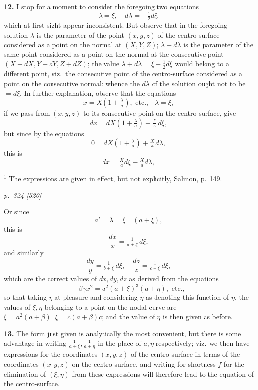 \documentclass[11pt,a4paper]{book}
\begin{document}
\textbf{12.} I stop for a moment to consider the foregoing two equations
\[
\lambda = \xi,\quad d\lambda = -\tfrac{1}{2}d\xi.
\]
which at first sight appear inconsistent. But observe that in the foregoing solution $\lambda$ is the parameter of the point $(x, y, z)$ of the centro-surface considered as a point on the normal at $(X, Y, Z)$; $\lambda + d\lambda$ is the parameter of the same point considered as a point on the normal at the consecutive point $(X + dX, Y + dY, Z + dZ)$; the value $\lambda + d\lambda = \xi - \tfrac{1}{2}d\xi$ would belong to a different point, viz.\ the consecutive point of the centro-surface considered as a point on the consecutive normal: whence the $d\lambda$ of the solution ought not to be $= d\xi$. In further explanation, observe that the equations
\[
x = X\!\left(1 + \tfrac{\lambda}{a}\right), \text{ etc.,} \quad\lambda = \xi,
\]
if we pass from $(x, y, z)$ to its consecutive point on the centro-surface, give
\[
dx = dX\!\left(1 + \tfrac{\lambda}{a}\right) + \tfrac{X}{a}\,d\xi,
\]
but since by the equations
\[
0 = dX\!\left(1 + \tfrac{\lambda}{a}\right) + \tfrac{X}{a}\,d\lambda,
\]
this is
\[
dx = \tfrac{X}{a}d\xi - \tfrac{X}{a}d\lambda,
\]

\smallskip
\footnotesize
$^1$ The expressions are given in effect, but not explicitly, Salmon, p.~149.

\clearpage

\bigskip
\textit{p.~324 [520]}
\smallskip

Or since
\[
a' = \lambda = \xi\quad(a + \xi),
\]
this is
\[
\frac{dx}{x} = \tfrac{1}{a + \xi}\,d\xi,
\]
and similarly
\[
\frac{dy}{y} = \tfrac{1}{b + \xi}\,d\xi,\quad
\frac{dz}{z} = \tfrac{1}{c + \xi}\,d\xi,
\]
which are the correct values of $dx, dy, dz$ as derived from the equations
\[
-\beta\gamma x^2 = a^2(a + \xi)^3(a + \eta), \text{ etc.,}
\]
so that taking $\eta$ at pleasure and considering $\eta$ as denoting this function of $\eta$, the values of $\xi, \eta$ belonging to a point on the nodal curve are $\xi = a^2(a + \beta), \, \xi = c(a + \beta) c$; and the value of $\eta$ is then given as before.

\textbf{13.} The form just given is analytically the most convenient, but there is some advantage in writing $\tfrac{1}{a + \xi}, \tfrac{1}{a + \eta}$ in the place of $a, \eta$ respectively; viz.\ we then have expressions for the coordinates $(x, y, z)$ of the centro-surface in terms of the coordinates $(x, y, z)$ on the centro-surface, and writing for shortness $f$ for the elimination of $(\xi, \eta)$ from these expressions will therefore lead to the equation of the centro-surface.
\end{document}
